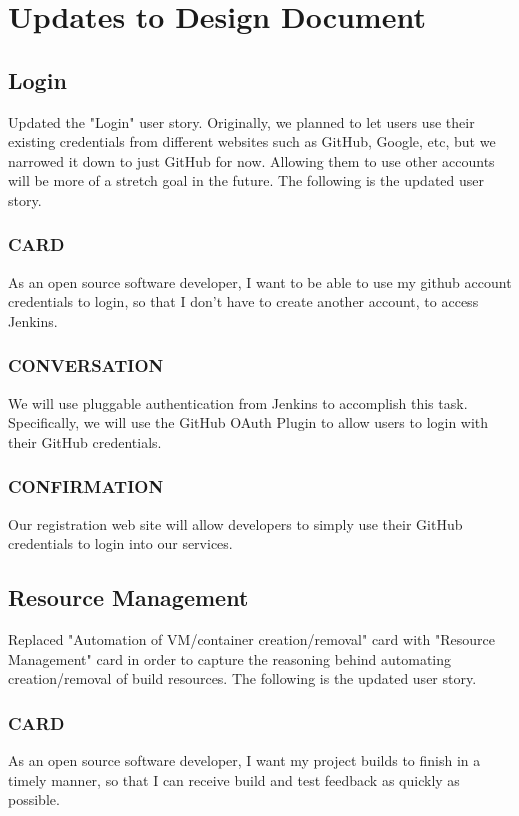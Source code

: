 \documentclass[10pt,letterpaper,onecolumn,draftclsnofoot]{IEEEtran}
\begin{document}
\section{Updates to Design Document}
\subsection{Login}
Updated the "Login" user story. Originally, we planned to let users use their existing credentials from different websites such as GitHub, Google, etc, but we narrowed it down to just GitHub for now. Allowing them to use other accounts will be more of a stretch goal in the future. The following is the updated user story.
\subsubsection{CARD}
As an open source software developer, I want to be able to use my github account credentials to login, so that I don't have to create another account, to access Jenkins.
\subsubsection{CONVERSATION}
We will use pluggable authentication from Jenkins to accomplish this task. Specifically, we will use the GitHub OAuth Plugin to allow users to login with their GitHub credentials.
\subsubsection{CONFIRMATION}
Our registration web site will allow developers to simply use their GitHub credentials to login into our services.
\subsection{Resource Management}
Replaced "Automation of VM/container creation/removal" card with "Resource Management" card in order to capture the reasoning behind automating creation/removal of build resources. The following is the updated user story.
\subsubsection{CARD}
As an open source software developer, I want my project builds to finish in a timely manner, so that I can receive build and test feedback as quickly as possible.
\end{document}

